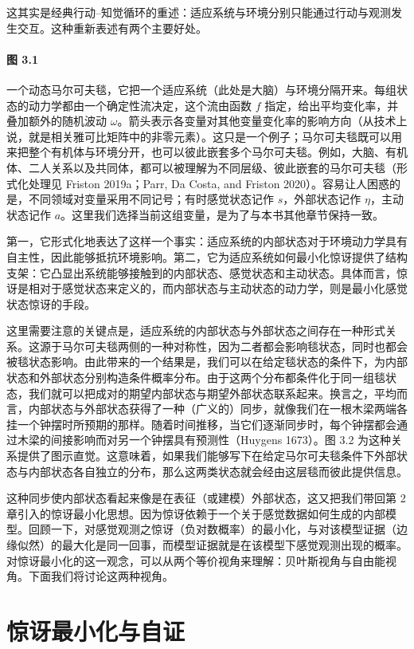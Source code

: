 这其实是经典行动--知觉循环的重述：适应系统与环境分别只能通过行动与观测发生交互。这种重新表述有两个主要好处。

\paragraph{图 3.1}
一个动态马尔可夫毯，它把一个适应系统（此处是大脑）与环境分隔开来。每组状态的动力学都由一个确定性流决定，这个流由函数 $f$ 指定，给出平均变化率，并叠加额外的随机波动 $\omega$。箭头表示各变量对其他变量变化率的影响方向（从技术上说，就是相关雅可比矩阵中的非零元素）。这只是一个例子；马尔可夫毯既可以用来把整个有机体与环境分开，也可以彼此嵌套多个马尔可夫毯。例如，大脑、有机体、二人关系以及共同体，都可以被理解为不同层级、彼此嵌套的马尔可夫毯（形式化处理见 Friston 2019a；Parr, Da Costa, and Friston 2020）。容易让人困惑的是，不同领域对变量采用不同记号；有时感觉状态记作 $s$，外部状态记作 $\eta$，主动状态记作 $a$。这里我们选择当前这组变量，是为了与本书其他章节保持一致。

第一，它形式化地表达了这样一个事实：适应系统的内部状态对于环境动力学具有自主性，因此能够抵抗环境影响。第二，它为适应系统如何最小化惊讶提供了结构支架：它凸显出系统能够接触到的内部状态、感觉状态和主动状态。具体而言，惊讶是相对于感觉状态来定义的，而内部状态与主动状态的动力学，则是最小化感觉状态惊讶的手段。

这里需要注意的关键点是，适应系统的内部状态与外部状态之间存在一种形式关系。这源于马尔可夫毯两侧的一种对称性，因为二者都会影响毯状态，同时也都会被毯状态影响。由此带来的一个结果是，我们可以在给定毯状态的条件下，为内部状态和外部状态分别构造条件概率分布。由于这两个分布都条件化于同一组毯状态，我们就可以把成对的期望内部状态与期望外部状态联系起来。换言之，平均而言，内部状态与外部状态获得了一种（广义的）同步，就像我们在一根木梁两端各挂一个钟摆时所预期的那样。随着时间推移，当它们逐渐同步时，每个钟摆都会通过木梁的间接影响而对另一个钟摆具有预测性（Huygens 1673）。图 3.2 为这种关系提供了图示直觉。这意味着，如果我们能够写下在给定马尔可夫毯条件下外部状态与内部状态各自独立的分布，那么这两类状态就会经由这层毯而彼此提供信息。

这种同步使内部状态看起来像是在表征（或建模）外部状态，这又把我们带回第 2 章引入的惊讶最小化思想。因为惊讶依赖于一个关于感觉数据如何生成的内部模型。回顾一下，对感觉观测之惊讶（负对数概率）的最小化，与对该模型证据（边缘似然）的最大化是同一回事，而模型证据就是在该模型下感觉观测出现的概率。对惊讶最小化的这一观念，可以从两个等价视角来理解：贝叶斯视角与自由能视角。下面我们将讨论这两种视角。

\section{惊讶最小化与自证}


